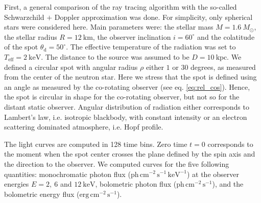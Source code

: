 \documentclass[iop, usenatbib]{emulateapj}
\newcommand{\Msun}{\ensuremath{M_{\odot}}}
\begin{document}
First, a general comparison of the ray tracing algorithm with the so-called Schwarzchild $+$ Doppler approximation \citep[see e.g.][]{PB06} was done.  
For simplicity, only spherical stars were considered here.
Main parameters were: the stellar mass $M = 1.6~\Msun$, the stellar radius $R = 12~\mathrm{km}$, the observer inclination $i = 60^{\circ}$ and the colatitude of the spot $\theta_{\mathrm{d}} = 50^{\circ}$.  
The effective temperature of the radiation was set to $T_{\mathrm{eff}} = 2~\mathrm{keV}$.  
The distance to the source was assumed to be $D = 10~\mathrm{kpc}$.  
We defined a circular spot with angular radius $\rho$ either $1$ or $30$ degrees, as measured from the center of the neutron star.  
Here we stress that the spot is defined using an angle as measured by the co-rotating observer (see eq.  \eqref{eq:rel_cos}).
Hence, the spot is circular in shape for the co-rotating observer, but not so for the distant static observer.
Angular distribution of radiation either corresponds to Lambert's law, i.e. isotropic blackbody, with constant intensity or an electron scattering dominated atmosphere, i.e. Hopf profile.


The light curves are computed in 128 time bins.  Zero time $t = 0$ corresponds to the moment when the spot center crosses the plane defined by the spin axis and the direction to the observer.  
We computed curves for the five following quantities: monochromatic photon flux ($\mathrm{ph}\,\mathrm{cm}^{-2}\,\mathrm{s}^{-1}\,\mathrm{keV}^{-1}$) at the observer energies $E = 2,~6$ and $12~\mathrm{keV}$, bolometric photon flux ($\mathrm{ph}\,\mathrm{cm}^{-2}\,\mathrm{s}^{-1}$), and the bolometric energy flux ($\mathrm{erg}\,\mathrm{cm}^{-2}\,\mathrm{s}^{-1}$).
\end{document}
